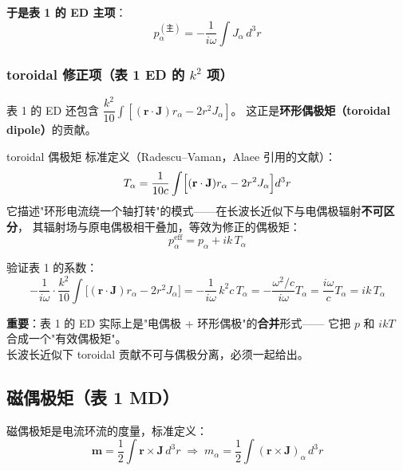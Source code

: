 \textbf{于是表 1 的 ED 主项}：
\begin{equation}
  p_\alpha^{(\text{主})} = -\frac{1}{i\omega}\int J_\alpha\,d^3r
\end{equation}

\subsubsection{toroidal 修正项（表 1 ED 的 $k^2$ 项）}

表 1 的 ED 还包含 $\dfrac{k^2}{10}\int[(\mathbf{r}\cdot\mathbf{J})r_\alpha - 2r^2J_\alpha]$。
这正是\textbf{环形偶极矩（toroidal dipole）}的贡献。

\begin{stepbox}{toroidal 偶极矩}
标准定义（Radescu--Vaman，Alaee 引用的文献）：
\begin{equation}
  T_\alpha = \frac{1}{10c}\int\Bigl[(\mathbf{r}\cdot\mathbf{J})r_\alpha - 2r^2J_\alpha\Bigr]d^3r
  \label{eq:toroidal_def}
\end{equation}
它描述"环形电流绕一个轴打转"的模式——在长波长近似下与电偶极辐射\textbf{不可区分}，
其辐射场与原电偶极相干叠加，等效为修正的偶极矩：
\begin{equation}
  p_\alpha^{\text{eff}} = p_\alpha + ik\,T_\alpha
\end{equation}
\end{stepbox}

验证表 1 的系数：
\begin{equation}
  -\frac{1}{i\omega}\cdot\frac{k^2}{10}\int\bigl[(\mathbf{r}\cdot\mathbf{J})r_\alpha - 2r^2J_\alpha\bigr]
  = -\frac{1}{i\omega}\,k^2c\,T_\alpha
  = -\frac{\omega^2/c}{i\omega}T_\alpha
  = \frac{i\omega}{c}T_\alpha = ik\,T_\alpha
\end{equation}

\begin{nontrivial}
\textbf{重要}：表 1 的 ED 实际上是"电偶极 + 环形偶极"的\textbf{合并}形式——
它把 $p$ 和 $ikT$ 合成一个"有效偶极矩"。\\
长波长近似下 toroidal 贡献不可与偶极分离，必须一起给出。
\end{nontrivial}

\subsection{磁偶极矩（表 1 MD）}

磁偶极矩是电流环流的度量，标准定义：
\begin{equation}
  \mathbf{m} = \frac12\int \mathbf{r}\times\mathbf{J}\,d^3r
  \;\Longrightarrow\;
  m_\alpha = \frac12\int (\mathbf{r}\times\mathbf{J})_\alpha\,d^3r
\end{equation}

